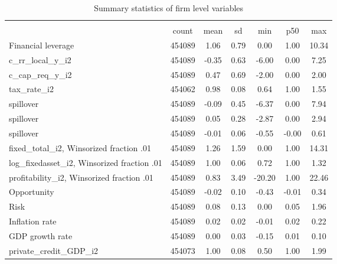 \begin{table}[htbp]\centering
\def\sym#1{\ifmmode^{#1}\else\(^{#1}\)\fi}
\caption{Summary statistics of firm level variables}
\begin{tabular}{l*{1}{cccccc}}
\hline\hline
                    &\multicolumn{6}{c}{}                                                         \\
                    &       count&        mean&          sd&         min&         p50&         max\\
\hline
Financial leverage  &      454089&        1.06&        0.79&        0.00&        1.00&       10.34\\
c\_rr\_local\_y\_i2     &      454089&       -0.35&        0.63&       -6.00&        0.00&        7.25\\
c\_cap\_req\_y\_i2      &      454089&        0.47&        0.69&       -2.00&        0.00&        2.00\\
tax\_rate\_i2         &      454062&        0.98&        0.08&        0.64&        1.00&        1.55\\
 spillover          &      454089&       -0.09&        0.45&       -6.37&        0.00&        7.94\\
 spillover          &      454089&        0.05&        0.28&       -2.87&        0.00&        2.94\\
 spillover          &      454089&       -0.01&        0.06&       -0.55&       -0.00&        0.61\\
fixed\_total\_i2, Winsorized fraction .01&      454089&        1.26&        1.59&        0.00&        1.00&       14.31\\
log\_fixedasset\_i2, Winsorized fraction .01&      454089&        1.00&        0.06&        0.72&        1.00&        1.32\\
profitability\_i2, Winsorized fraction .01&      454089&        0.83&        3.49&      -20.20&        1.00&       22.46\\
Opportunity         &      454089&       -0.02&        0.10&       -0.43&       -0.01&        0.34\\
Risk                &      454089&        0.08&        0.13&        0.00&        0.05&        1.96\\
Inflation rate      &      454089&        0.02&        0.02&       -0.01&        0.02&        0.22\\
GDP growth rate     &      454089&        0.00&        0.03&       -0.15&        0.01&        0.10\\
private\_credit\_GDP\_i2&      454073&        1.00&        0.08&        0.50&        1.00&        1.99\\

\end{tabular}
\end{table}
